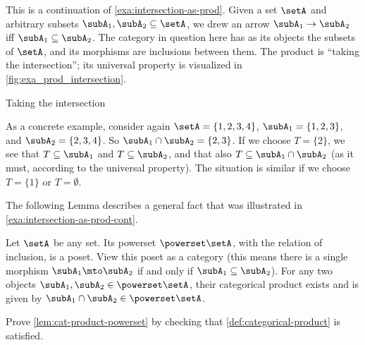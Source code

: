 \begin{example}\label{exa:intersection-as-prod-cont}
This is a continuation of \cref{exa:intersection-as-prod}.
Given a set $\setA$ and arbitrary subsets $\subA_1, \subA_2 \subseteq \setA$, we drew an arrow $\subA_1 \to \subA_2$ iff $\subA_1 \subseteq \subA_2$. The category in question here has as its objects the subsets of $\setA$, and its morphisms are inclusions between them. The product is ``taking the intersection''; its universal property is visualized in \cref{fig:exa_prod_intersection}. 
  \begin{marginfigure}
  \begin{center}
  \end{center}
    \caption{Taking the intersection}
    \label{fig:exa_prod_intersection_cont}
  \end{marginfigure}
 As a concrete example, consider again $\setA = \{ 1, 2, 3, 4 \}$, $\subA_1 = \{ 1, 2, 3 \}$, and $\subA_2 = \{2, 3, 4 \}$. So $\subA_1 \cap \subA_2 = \{2, 3 \}$. If we choose $T = \{ 2 \}$, we see that $T \subseteq \subA_1$ and $T \subseteq \subA_2$, and that also $T \subseteq \subA_1 \cap \subA_2$ (as it must, according to the universal property). The situation is similar if we choose $T = \{ 1\}$ or $T = \emptyset$. 
\end{example}

The following Lemma describes a general fact that was illustrated in \cref{exa:intersection-as-prod-cont}.
\begin{lemma}\label{lem:cat-product-powerset}
Let $\setA$ be any set. Its powerset $\powerset \setA$, with the relation of inclusion, is a poset. View this poset as a category (this means there is a single morphism $\subA_1 \mto \subA_2$ if and only if $\subA_1 \subseteq \subA_2$). For any two objects $\subA_1, \subA_2 \in \powerset \setA$, their categorical product exists and is given by $\subA_1 \cap \subA_2 \in \powerset \setA$. 
\end{lemma}

\begin{gradedexercise}\label{ex:CatProductPowerset}
Prove \cref{lem:cat-product-powerset} by checking that \cref{def:categorical-product} is satisfied. 
\end{gradedexercise}


